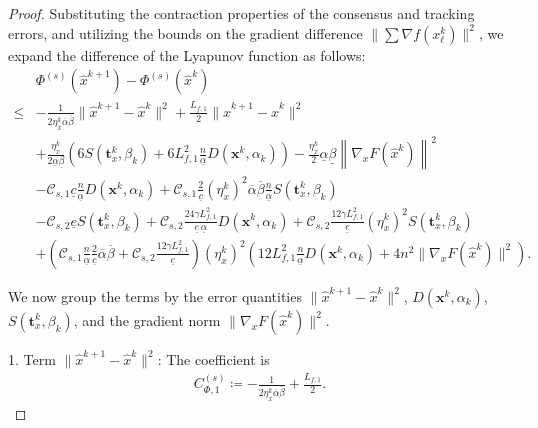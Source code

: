 \documentclass{article}
\theoremstyle{plain}
\theoremstyle{definition}
\theoremstyle{remark}
\begin{document}
\begin{proof}
    Substituting the contraction properties of the consensus and tracking errors, and utilizing the bounds on the gradient difference $\|\sum \nabla f(x_\ell^k)\|^2$, we expand the difference of the Lyapunov function as follows:
    \begin{align*}
        &\Phi^{(s)}({\hat{x}}^{k+1}) - \Phi^{(s)}({\hat{x}}^{k}) \\
        \leq{}& -\frac{1}{2\eta_x^{k}\overline{\alpha}\overline{\beta}} \|\hat{x}^{k+1}-\hat{x}^{k}\|^{2} + \frac{L_{f,1}}{2} \|\hat{x}^{k+1}-\hat{x}^{k}\|^{2} \\
        &+ \frac{\eta_x^{k}}{2\underline{\alpha}\underline{\beta}} \left( 6S(\mathbf{t}_{x}^{k},\beta_{k}) + 6L_{f,1}^{2} \frac{n}{\underline{\alpha}}  D(\mathbf{x}^{k},\alpha_{k}) \right) - \frac{\eta_x^{k}}{2}\underline{\alpha}\underline{\beta} \left\| \nabla_{x}F(\hat{x}^{k}) \right\|^{2} \\
        &- \mathcal{C}_{s,1} \underline{c} \frac{n}{\underline{\alpha}} D(\mathbf{x}^{k}, \alpha_{k}) + \mathcal{C}_{s,1} \frac{2}{\underline{c}}(\eta_{x}^{k})^{2} \overline{\alpha}\overline{\beta} \frac{n}{\underline{\alpha}}S(\mathbf{t}_{x}^{k}, \beta_{k}) \\
        &- \mathcal{C}_{s,2} \underline{e} S(\mathbf{t}_{x}^{k},\beta_{k}) + \mathcal{C}_{s,2} \frac{24\gamma L_{f,1}^{2}}{\underline{e}\, \underline{\alpha}} D(\mathbf{x}^{k}, \alpha_{k}) + \mathcal{C}_{s,2} \frac{12\gamma L_{f,1}^2}{\underline{e}} (\eta_{x}^{k})^{2} S(\mathbf{t}_{x}^{k},\beta_{k}) \\
        &+ \left( \mathcal{C}_{s,1}\frac{n}{\underline{\alpha}} \frac{2}{\underline{c}} \overline{\alpha}\overline{\beta} + \mathcal{C}_{s,2} \frac{12\gamma L_{f,1}^{2}}{\underline{e}} \right)(\eta_{x}^{k})^{2} \left( 12 L_{f,1}^{2}\frac{n}{\underline{\alpha}}D(\mathbf{x}^{k}, \alpha_{k}) + 4n^{2}\big\| \nabla_{x} F({\hat{x}}^k) \big\|^{2} \right).
    \end{align*}
    
    We now group the terms by the error quantities $\|\hat{x}^{k+1}-\hat{x}^{k}\|^{2}$, $D(\mathbf{x}^{k}, \alpha_{k})$, $S(\mathbf{t}_{x}^{k},\beta_{k})$, and the gradient norm $\|\nabla_{x} F({\hat{x}}^k)\|^{2}$.
    
    1. Term $\|\hat{x}^{k+1}-\hat{x}^{k}\|^{2}$: The coefficient is
    \begin{align*}
       C_{\Phi,1}^{(s)} \coloneqq -\frac{1}{2\eta_x^{k}\overline{\alpha}\overline{\beta}} + \frac{L_{f,1}}{2}.
    \end{align*}
    

\end{proof}
\end{document}
